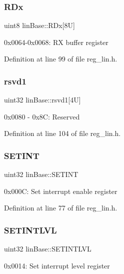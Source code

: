 \subsubsection{\texorpdfstring{R\+Dx}{RDx}}
{\footnotesize\ttfamily uint8 lin\+Base\+::\+R\+Dx\mbox{[}8\+U\mbox{]}}

0x0064-\/0x0068\+: RX buffer register 

Definition at line 99 of file reg\+\_\+lin.\+h.

\mbox{\label{structlinBase_a925ff0ab5a8b29205ed6a4d64a0f0735}} 
\subsubsection{\texorpdfstring{rsvd1}{rsvd1}}
{\footnotesize\ttfamily uint32 lin\+Base\+::rsvd1\mbox{[}4\+U\mbox{]}}

0x0080 -\/ 0x8C\+: Reserved 

Definition at line 104 of file reg\+\_\+lin.\+h.

\mbox{\label{structlinBase_a993fe9dfb30e8c0b30778c1713a0fdc2}} 
\subsubsection{\texorpdfstring{S\+E\+T\+I\+NT}{SETINT}}
{\footnotesize\ttfamily uint32 lin\+Base\+::\+S\+E\+T\+I\+NT}

0x000C\+: Set interrupt enable register 

Definition at line 77 of file reg\+\_\+lin.\+h.

\mbox{\label{structlinBase_ae04c1d83e00528417ca3175a224b684e}} 
\subsubsection{\texorpdfstring{S\+E\+T\+I\+N\+T\+L\+VL}{SETINTLVL}}
{\footnotesize\ttfamily uint32 lin\+Base\+::\+S\+E\+T\+I\+N\+T\+L\+VL}

0x0014\+: Set interrupt level register 

